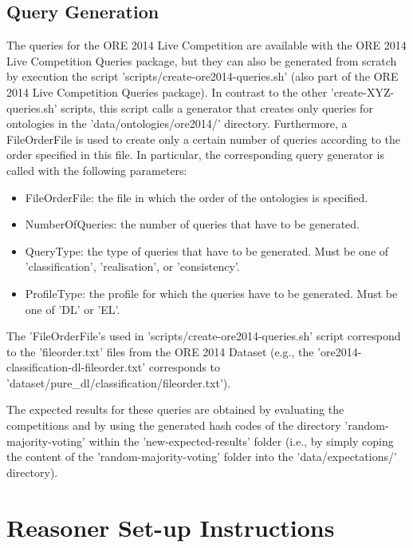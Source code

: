 \documentclass{article}
\begin{document}
\subsection{Query Generation}


The queries for the ORE 2014 Live Competition are available with the ORE 2014 Live Competition Queries package, but they can also be generated from scratch by execution the script 'scripts/create-ore2014-queries.sh' (also part of the ORE 2014 Live Competition Queries package). 
In contrast to the other 'create-XYZ-queries.sh' scripts, this script calls a generator that creates only queries for ontologies in the 'data/ontologies/ore2014/' directory. 
Furthermore, a FileOrderFile is used to create only a certain number of queries according to the order specified in this file.
In particular, the corresponding query generator is called with the following parameters:

\begin{itemize}
\item FileOrderFile: the file in which the order of the ontologies is specified.
\item NumberOfQueries: the number of queries that have to be generated.
\item QueryType: the type of queries that have to be generated. Must be one of 'classification', 'realisation', or 'consistency'.
\item ProfileType: the profile for which the queries have to be generated. Must be one of 'DL' or 'EL'.
\end{itemize}

The 'FileOrderFile's used in 'scripts/create-ore2014-queries.sh' script correspond to the 'fileorder.txt' files from the ORE 2014 Dataset (e.g., the 'ore2014-classification-dl-fileorder.txt' corresponds to 'dataset/pure\_dl/classification/fileorder.txt').

The expected results for these queries are obtained by evaluating the competitions and by using the generated hash codes of the directory 'random-majority-voting' within the 'new-expected-results' folder (i.e., by simply coping the content of the 'random-majority-voting' folder into the 'data/expectations/' directory).



\section{Reasoner Set-up Instructions}
\end{document}
